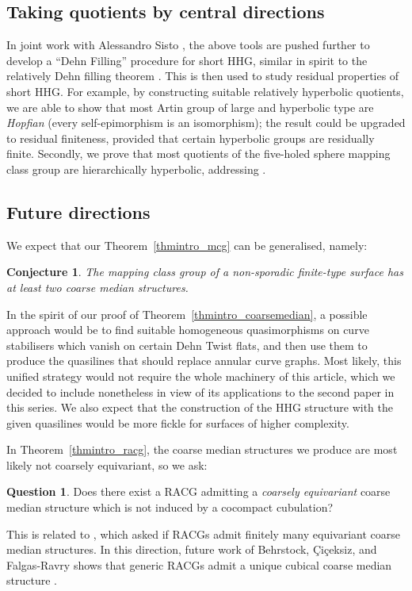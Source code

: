 \documentclass[svgnames]{amsart}
\theoremstyle{plain}
\newtheorem{conjecture}[thmintro]{Conjecture}
\theoremstyle{definition}
\newtheorem{questintro}[thmintro]{Question}
\begin{document}
\subsection*{Taking quotients by central directions}
In joint work with Alessandro Sisto \cite{short_HHG:II}, the above tools are pushed further to develop a “Dehn Filling” procedure for short HHG, similar in spirit to the relatively Dehn filling theorem \cite{Osin_Dehn_Fill, GM}. This is then used to study residual properties of short HHG. For example, by constructing suitable relatively hyperbolic quotients, we are able to show that most Artin group of large and hyperbolic type are \emph{Hopfian} (every self-epimorphism is an isomorphism); the result could be upgraded to residual finiteness, provided that certain hyperbolic groups are residually finite. Secondly, we prove that most quotients of the five-holed sphere mapping class group are hierarchically hyperbolic, addressing \cite[Question 3]{rigidity_mcg_mod_dt}. 


\subsection*{Future directions}
We expect that our Theorem~\ref{thmintro_mcg} can be generalised, namely:
\begin{conjecture}
    The mapping class group of a non-sporadic finite-type surface has at least two coarse median structures.
\end{conjecture}
In the spirit of our proof of Theorem~\ref{thmintro_coarsemedian}, a possible approach would be to find suitable homogeneous quasimorphisms on curve stabilisers which vanish on certain Dehn Twist flats, and then use them to produce the quasilines that should replace annular curve graphs. Most likely, this unified strategy would not require the whole machinery of this article, which we decided to include nonetheless in view of its applications to the second paper in this series. We also expect that the construction of the HHG structure with the given quasilines would be more fickle for surfaces of higher complexity.

\par\medskip
In Theorem~\ref{thmintro_racg}, the coarse median structures we produce are most likely not coarsely equivariant, so we ask:
\begin{questintro}
    Does there exist a RACG admitting a \emph{coarsely equivariant} coarse median structure which is not induced by a cocompact cubulation?
\end{questintro}
This is related to \cite[Question 4]{Elia:coarse_med_preserving}, which asked if RACGs admit finitely many equivariant coarse median structures. In this direction, future work of Behrstock, {\c{C}}i{\c{c}}eksiz, and Falgas-Ravry shows that generic RACGs admit a unique cubical coarse median structure \cite{BehrstockCiceksizFalgasRavry:connectivity}.
\end{document}
